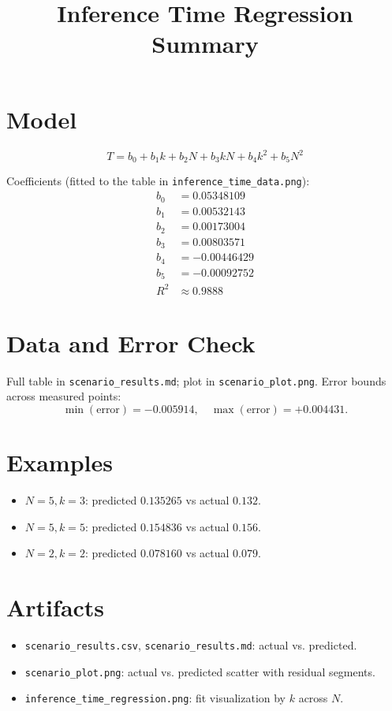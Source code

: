 \documentclass{article}
\begin{document}
\title{Inference Time Regression Summary}
\author{}
\date{}
\maketitle

\section*{Model}
\[
T = b_0 + b_1 k + b_2 N + b_3 kN + b_4 k^2 + b_5 N^2
\]

Coefficients (fitted to the table in \texttt{inference\_time\_data.png}):
\begin{align*}
b_0 &= 0.05348109 \\
b_1 &= 0.00532143 \\
b_2 &= 0.00173004 \\
b_3 &= 0.00803571 \\
b_4 &= -0.00446429 \\
b_5 &= -0.00092752 \\
R^2 &\approx 0.9888
\end{align*}

\section*{Data and Error Check}
Full table in \texttt{scenario\_results.md}; plot in \texttt{scenario\_plot.png}. Error bounds across measured points:
\[
\min(\text{error}) = -0.005914, \quad \max(\text{error}) = +0.004431.
\]

\section*{Examples}
\begin{itemize}
  \item $N=5, k=3$: predicted $0.135265$ vs actual $0.132$.
  \item $N=5, k=5$: predicted $0.154836$ vs actual $0.156$.
  \item $N=2, k=2$: predicted $0.078160$ vs actual $0.079$.
\end{itemize}

\section*{Artifacts}
\begin{itemize}
  \item \texttt{scenario\_results.csv}, \texttt{scenario\_results.md}: actual vs. predicted.
  \item \texttt{scenario\_plot.png}: actual vs. predicted scatter with residual segments.
  \item \texttt{inference\_time\_regression.png}: fit visualization by $k$ across $N$.
\end{itemize}
\end{document}
